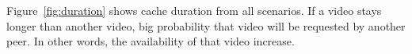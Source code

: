 \documentclass[10pt,final,journal,a4paper]{IEEEtran}
\begin{document}

Figure~\ref{fig:duration} shows cache duration from all scenarios.  
If a video stays longer than another video, big probability that video will be requested by another peer.
In other words, the availability of that video increase.
\end{document}
